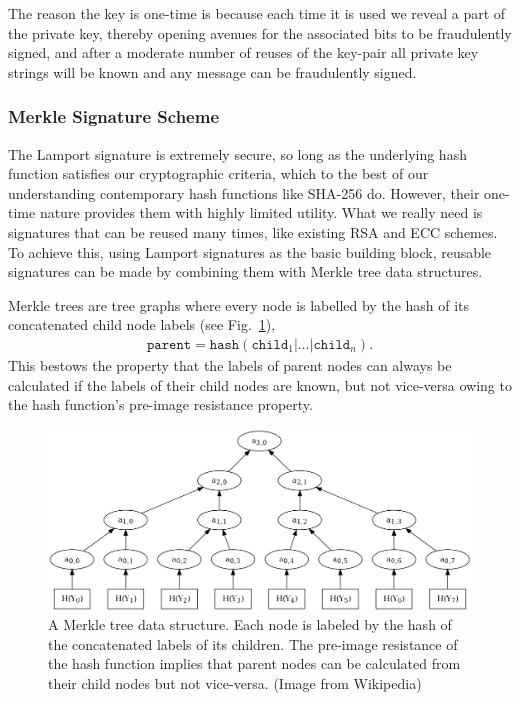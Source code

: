 The reason the key is one-time is because each time it is used we reveal a part of the private key, thereby opening avenues for the associated bits to be fraudulently signed, and after a moderate number of reuses of the key-pair all private key strings will be known and any message can be fraudulently signed.

\subsubsection{Merkle Signature Scheme} \label{merkle-signature-scheme}

The Lamport signature is extremely secure, so long as the underlying hash function satisfies our cryptographic criteria, which to the best of our understanding contemporary hash functions like SHA-256 do. However, their one-time nature provides them with highly limited utility. What we really need is signatures that can be reused many times, like existing RSA and ECC schemes. To achieve this, using Lamport signatures as the basic building block, reusable signatures can be made by combining them with Merkle tree data structures.

Merkle trees are tree graphs where every node is labelled by the hash of its concatenated child node labels (see Fig.~\ref{fig:Merkle}), 
\begin{align}
	\mathtt{parent}=\mathtt{hash}(\mathtt{child}_1|\dots|\mathtt{child}_n).
\end{align}
This bestows the property that the labels of parent nodes can always be calculated if the labels of their child nodes are known, but not vice-versa owing to the hash function's pre-image resistance property.

\begin{figure}[!htb]
	\centering
	\includegraphics[width=\columnwidth]{figures/Merkle_tree}
	\caption{A Merkle tree data structure. Each node is labeled by the hash of the concatenated labels of its children. The pre-image resistance of the hash function implies that parent nodes can be calculated from their child nodes but not vice-versa. (Image from Wikipedia)} \label{fig:Merkle}
\end{figure}

